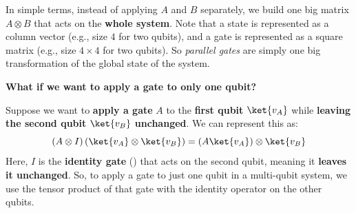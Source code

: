 \highspace
In simple terms, instead of applying $A$ and $B$ separately, we build one big matrix $A \otimes B$ that acts on the \textbf{whole system}. Note that a state is represented as a column vector (e.g., size $4$ for two qubits), and a gate is represented as a square matrix (e.g., size $4 \times 4$ for two qubits). So \emph{parallel gates} are simply one big transformation of the global state of the system.

\highspace
\begin{flushleft}
    \textcolor{Red2}{ \textbf{What if we want to apply a gate to only one qubit?}}
\end{flushleft}
Suppose we want to \textbf{apply a gate} $A$ to the \textbf{first qubit} $\ket{v_{A}}$ while \textbf{leaving the second qubit} $\ket{v_{B}}$ \textbf{unchanged}. We can represent this as:
\begin{equation}
    \left(A \otimes I\right)\left(\ket{v_{A}} \otimes \ket{v_{B}}\right) = \left(A\ket{v_{A}}\right) \otimes \ket{v_{B}}
\end{equation}
Here, $I$ is the \textbf{identity gate} () that acts on the second qubit, meaning it \textbf{leaves it unchanged}. So, to apply a gate to just one qubit in a multi-qubit system, we use the tensor product of that gate with the identity operator on the other qubits.

